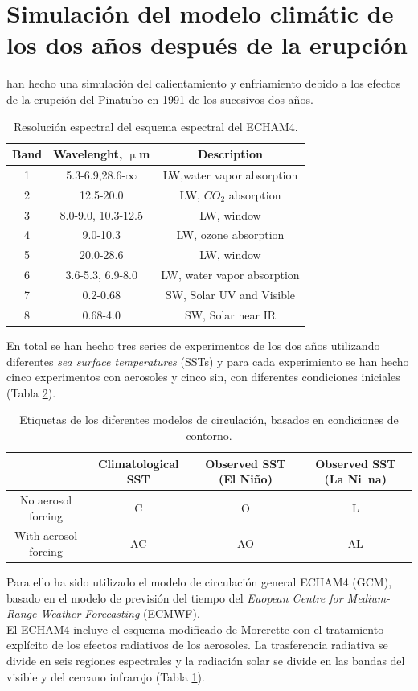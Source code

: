 \documentclass[a4apaper,twocolumn,10pt]{article}
\begin{document}
\section{Simulaci\'on del modelo clim\'atic de los dos a\~nos despu\'es de la erupci\'on}
\cite{kirchner1999climate} han hecho una simulaci\'on del calientamiento y enfriamiento debido a los efectos de la erupci\'on del Pinatubo en 1991 de los sucesivos dos a\~nos. 
\begin{table}[b]
\centering
\begin{tabular}{c|c|c}
Band&Wavelenght, $\upmu$m&Description \\ \hline
1&5.3-6.9,28.6-$\infty$&LW,water vapor absorption \\
2&12.5-20.0&LW, $CO_{2}$ absorption\\
3&8.0-9.0, 10.3-12.5&LW, window \\
4&9.0-10.3&LW, ozone absorption \\
5&20.0-28.6&LW, window \\
6&3.6-5.3, 6.9-8.0&LW, water vapor absorption \\
7&0.2-0.68&SW, Solar UV and Visible \\
8&0.68-4.0&SW, Solar near IR \\ \hline
\end{tabular}
\caption{Resoluci\'on espectral del esquema espectral del ECHAM4.} \label{tlb:Tabla1}
\end{table}
En total se han hecho tres series de experimentos de los dos a\~nos utilizando diferentes \textit{sea surface temperatures} (SSTs) y para cada experimiento se han hecho cinco experimentos con aerosoles y cinco sin, con diferentes condiciones iniciales (Tabla \ref{tlb:Tabla2}).
\begin{table}[b]
\centering
\begin{tabular}{c|c|c|c}
&Climatological SST&Observed SST (El Ni\~no)&Observed SST (La Ni~na) \\ \hline
No aerosol forcing&C&O&L\\
With aerosol forcing&AC&AO&AL\\ \hline
\end{tabular}
\caption{Etiquetas de los diferentes modelos de circulaci\'on, basados en condiciones de contorno.} \label{tlb:Tabla2}
\end{table}Para ello ha sido utilizado el modelo de circulaci\'on general ECHAM4 (GCM), basado en el modelo de previsi\'on del tiempo del \textit{Euopean Centre for Medium-Range Weather Forecasting } (ECMWF). \\El ECHAM4 incluye el esquema modificado de Morcrette con el tratamiento expl\'icito de los efectos radiativos de los aerosoles. La trasferencia radiativa se divide en seis regiones espectrales 
y la radiaci\'on solar se divide en las bandas del visible y del cercano infrarojo (Tabla \ref{tlb:Tabla1}). 
\end{document}
